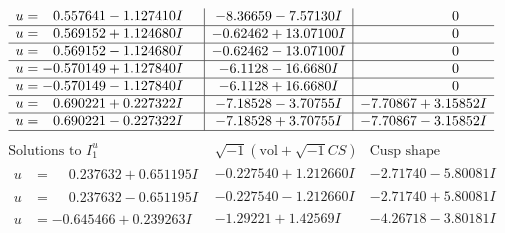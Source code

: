 \documentclass[1p]{elsarticle_modified}
\theoremstyle{definition}
\newcommand{\I}{\sqrt{-1}}
\begin{document}
$$\begin{array}{c|c|c}
\begin{aligned}
u &= \phantom{-}0.557641 - 1.127410 I\end{aligned}
 & -8.36659 - 7.57130 I & \phantom{-0.000000 } 0 \\ \hline\begin{aligned}
u &= \phantom{-}0.569152 + 1.124680 I\end{aligned}
 & -0.62462 + 13.07100 I & \phantom{-0.000000 } 0 \\ \hline\begin{aligned}
u &= \phantom{-}0.569152 - 1.124680 I\end{aligned}
 & -0.62462 - 13.07100 I & \phantom{-0.000000 } 0 \\ \hline\begin{aligned}
u &= -0.570149 + 1.127840 I\end{aligned}
 & -6.1128 - 16.6680 I & \phantom{-0.000000 } 0 \\ \hline\begin{aligned}
u &= -0.570149 - 1.127840 I\end{aligned}
 & -6.1128 + 16.6680 I & \phantom{-0.000000 } 0 \\ \hline\begin{aligned}
u &= \phantom{-}0.690221 + 0.227322 I\end{aligned}
 & -7.18528 - 3.70755 I & -7.70867 + 3.15852 I \\ \hline\begin{aligned}
u &= \phantom{-}0.690221 - 0.227322 I\end{aligned}
 & -7.18528 + 3.70755 I & -7.70867 - 3.15852 I\\
 \hline 
 \end{array}$$\newpage$$\begin{array}{c|c|c}  
\text{Solutions to }I^u_{1}& \I (\text{vol} + \sqrt{-1}CS) & \text{Cusp shape}\\
 \hline 
\begin{aligned}
u &= \phantom{-}0.237632 + 0.651195 I\end{aligned}
 & -0.227540 + 1.212660 I & -2.71740 - 5.80081 I \\ \hline\begin{aligned}
u &= \phantom{-}0.237632 - 0.651195 I\end{aligned}
 & -0.227540 - 1.212660 I & -2.71740 + 5.80081 I \\ \hline\begin{aligned}
u &= -0.645466 + 0.239263 I\end{aligned}
 & -1.29221 + 1.42569 I & -4.26718 - 3.80181 I \\ \hline\begin{aligned}

\end{aligned}
\end{array}$$
\end{document}
